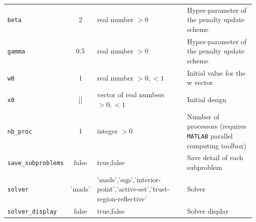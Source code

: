 \documentclass[11pt]{article}
\begin{document}
\begin{table}[h!]
\begin{tabular}{lc>{\centering\arraybackslash}p{5.5cm}>{\centering\arraybackslash}p{6cm}}
    \texttt{beta}               & 2           & real number $> 0$                 & Hyper-parameter of the penalty update scheme                                  \\
    \texttt{gamma}              & 0.5         & real number $> 0$                 & Hyper-parameter of the penalty update scheme                                  \\
    \texttt{w0}                 & 1           & real number $> 0, < 1$            & Initial value for the w vector                                                \\
    \texttt{x0}                 & []          & vector of real numbers $> 0, < 1$ & Initial design                                                                \\
    \texttt{nb\_proc}           & 1           & integer $> 0$                     & Number of processors (requires \texttt{MATLAB} parallel computing toolbox)    \\
    \texttt{save\_subproblems}  & false       & true,false                        & Save detail of each subproblem                                                \\
    \texttt{solver}             & 'mads'      & 'mads','sqp','interior-point','active-set','trust-region-reflective' & Solver                                     \\
    \texttt{solver\_display}    & false       & true,false                        & Solver display                                                                \\

    \hline\hline
  \end{tabular}
\end{table}
\end{document}
